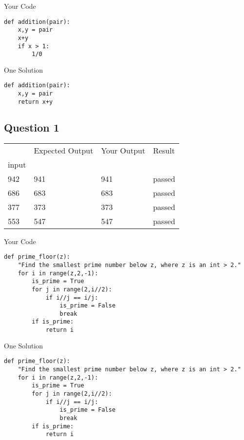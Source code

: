 \documentclass[11pt]{article}
\begin{document}
\bigskip
\noindent Your Code
\begin{lstlisting}
def addition(pair):
    x,y = pair
    x+y
    if x > 1:
    	1/0

\end{lstlisting}
\bigskip
\noindent One Solution
\begin{lstlisting}
def addition(pair):
    x,y = pair
    return x+y

\end{lstlisting}
\subsection*{Question 1}
\begin{tabular}{llll}
\toprule
{} & {Expected Output} & {Your Output} & {Result} \\
{input} & {} & {} & {} \\
\midrule
942 & 941 & 941 & \cellcolor{green!10}passed \\
686 & 683 & 683 & \cellcolor{green!10}passed \\
377 & 373 & 373 & \cellcolor{green!10}passed \\
553 & 547 & 547 & \cellcolor{green!10}passed \\
\bottomrule
\end{tabular}

\bigskip
\noindent Your Code
\begin{lstlisting}
def prime_floor(z):
    "Find the smallest prime number below z, where z is an int > 2."
    for i in range(z,2,-1):
        is_prime = True
        for j in range(2,i//2):
            if i//j == i/j:
                is_prime = False
                break
        if is_prime:
            return i

\end{lstlisting}
\bigskip
\noindent One Solution
\begin{lstlisting}
def prime_floor(z):
    "Find the smallest prime number below z, where z is an int > 2."
    for i in range(z,2,-1):
        is_prime = True
        for j in range(2,i//2):
            if i//j == i/j:
                is_prime = False
                break
        if is_prime:
            return i

\end{lstlisting}
\end{document}
